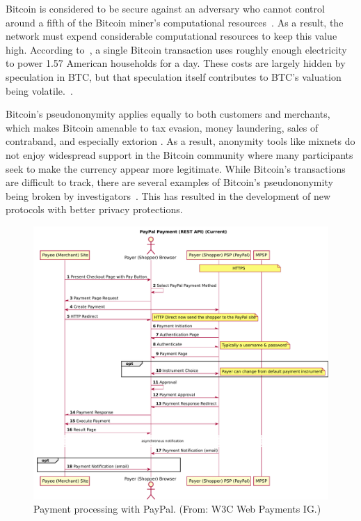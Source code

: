 \documentclass{llncs}
\begin{document}
Bitcoin is considered to be secure against an adversary who cannot
control around a fifth of the Bitcoin miner's computational
resources~\cite{BTC:Bahack13,BTC:MajorityNotEnough,BTC:Eclipse}.  %
As a result, the network must expend considerable computational
resources to keep this value high.
According to~\cite{vice_btc_unsustainable}, a single Bitcoin transaction uses roughly enough
electricity to power 1.57 American households for a day.
These costs are largely hidden by speculation in BTC,
but that speculation itself contributes to BTC's valuation being
volatile.~\cite{jeffries_economists_v_btc,lehmann_btc_fools_gold,lewis_btc_is_junk}. %


Bitcoin's pseudononymity applies equally to both customers and
merchants, which makes Bitcoin amen\-able to tax evasion, money
laundering, sales of contraband, and especially extorion
 \cite{NYA:CyberExtortionRisk}.  
As a result, anonymity tools like mixnets do not enjoy widespread
support in the Bitcoin community where many participants seek to make
the currency appear more legitimate.  While Bitcoin's transactions
are difficult to track, there are several examples of Bitcoin's
pseudononymity being broken by investigators~\cite{BTC:Anonymity}.  
This has resulted in the development of new protocols with better
privacy protections.

\begin{figure}[t!]
\includegraphics[width=\textwidth]{figs/paypal.pdf}
\caption{Payment processing with PayPal. (From: W3C Web Payments IG.)}
\label{fig:paypal}
\end{figure}
\end{document}
